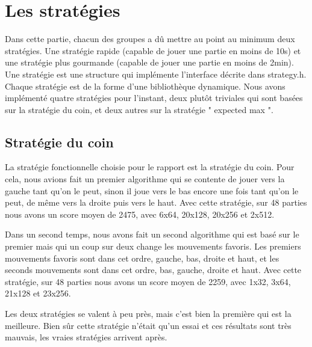 \documentclass[12pt]{article}
\begin{document}
\newpage
\section{Les stratégies}
Dans cette partie, chacun des groupes a dû mettre au point au minimum deux
stratégies. Une stratégie rapide (capable de jouer une partie en moins de
10s) et une stratégie plus gourmande (capable de jouer une partie en moins de
2min). Une stratégie est une structure qui implémente l’interface décrite
dans strategy.h. Chaque stratégie est de la forme d’une bibliothèque
dynamique. Nous avons implémenté quatre stratégies pour l'instant, deux
plutôt triviales qui sont basées sur la stratégie du coin, et deux autres sur
la stratégie " expected max ". 

\subsection{Stratégie du coin}
La stratégie fonctionnelle choisie pour le rapport est la stratégie du coin.
Pour cela, nous avions fait un premier algorithme qui se contente de jouer vers
la gauche tant qu'on le peut, sinon il joue vers le bas encore une fois tant
qu'on le peut, de même vers la droite puis vers le haut. Avec cette stratégie,
sur 48 parties nous avons un score moyen de 2475, avec 6x64, 20x128, 20x256 et
2x512.

Dans un second temps, nous avons fait un second algorithme qui est basé sur le
premier mais qui un coup sur deux change les mouvements favoris. Les premiers
mouvements favoris sont dans cet ordre, gauche, bas, droite et haut, et les
seconds mouvements sont dans cet ordre, bas, gauche, droite et haut. Avec cette
stratégie, sur 48 parties nous avons un score moyen de 2259, avec 1x32, 3x64,
21x128 et 23x256.

Les deux stratégies se valent à peu près, mais c'est bien la première qui est la
meilleure. Bien sûr cette stratégie n'était qu'un essai et ces résultats sont
très mauvais, les vraies stratégies arrivent après.
\end{document}
